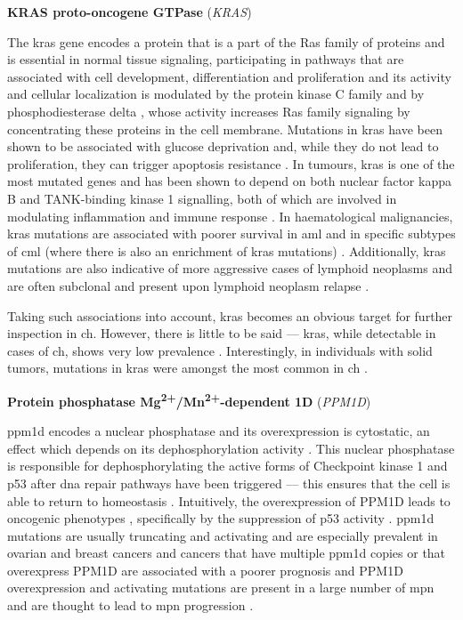 \noindent \textbf{KRAS proto-oncogene GTPase} (\textit{KRAS})

The \ac{kras} gene encodes a protein that is a part of the Ras family of proteins and is essential in normal tissue signaling, participating in pathways that are associated with cell development, differentiation and proliferation \cite{Kranenburg2005-sl} and its activity and cellular localization is modulated by the protein kinase C family \cite{Bivona2006-jq} and by phosphodiesterase delta \cite{Chandra2011-ij}, whose activity increases Ras family signaling by concentrating these proteins in the cell membrane. Mutations in \ac{kras} have been shown to be associated with glucose deprivation and, while they do not lead to proliferation, they can trigger apoptosis resistance \cite{Yun2009-an}. In tumours, \ac{kras} is one of the most mutated genes \cite{Kranenburg2005-sl} and has been shown to depend on both nuclear factor kappa B and TANK-binding kinase 1 signalling, both of which are involved in modulating inflammation and immune response \cite{Meylan2009-nc,Barbie2009-hz}. In haematological malignancies, \ac{kras} mutations are associated with poorer survival in \ac{aml} \cite{Ball2019-cs} and in specific subtypes of \ac{cml} (where there is also an enrichment of \ac{kras} mutations) \cite{Vendramini2019-oh}. Additionally, \ac{kras} mutations are also indicative of more aggressive cases of lymphoid neoplasms \cite{Neri1988-xj} and are often subclonal and present upon lymphoid neoplasm relapse \cite{Oshima2016-vy,Malinowska-Ozdowy2015-bv}.

Taking such associations into account, \ac{kras} becomes an obvious target for further inspection in \ac{ch}. However, there is little to be said --- \ac{kras}, while detectable in cases of \ac{ch}, shows very low prevalence \cite{Wang2019-pl,Genovese2014-eu,Zehir2017-gh,Bolton2020-ct,Xie2014-np}. Interestingly, in individuals with solid tumors, mutations in \ac{kras} were amongst the most common in \ac{ch} \cite{Conces2019-yq,Wang2019-pl}.

\noindent \textbf{Protein phosphatase Mg\textsuperscript{2+}/Mn\textsuperscript{2+}-dependent 1D} (\textit{PPM1D})

\Ac{ppm1d} encodes a nuclear phosphatase and its overexpression is cytostatic, an effect which depends on its dephosphorylation activity \cite{Fiscella1997-ay}. This nuclear phosphatase is responsible for dephosphorylating the active forms of Checkpoint kinase 1 and p53 after \ac{dna} repair pathways have been triggered --- this ensures that the cell is able to return to homeostasis \cite{Lu2005-it}. Intuitively, the overexpression of PPM1D leads to oncogenic phenotypes \cite{Li2002-dl}, specifically by the suppression of p53 activity \cite{Bulavin2002-ft}. \ac{ppm1d} mutations are usually truncating and activating and are especially prevalent in ovarian and breast cancers \cite{Bolton2020-ct} and cancers that have multiple \ac{ppm1d} copies or that overexpress PPM1D are associated with a poorer prognosis \cite{Lambros2010-yo,Castellino2008-wr,Yang2015-kz} and PPM1D overexpression and activating mutations are present in a large number of \ac{mpn} and are thought to lead to \ac{mpn} progression \cite{Marcellino2019-ze}. 

